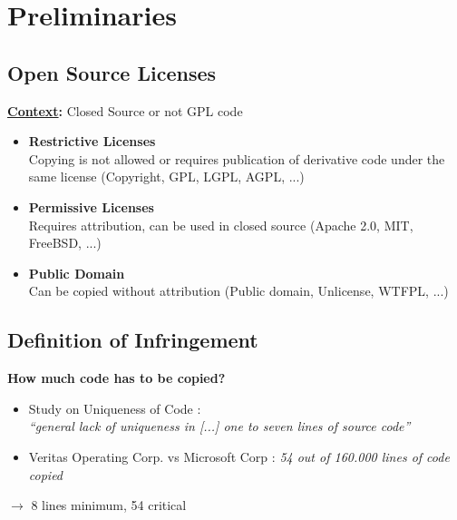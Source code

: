 
\section{Preliminaries}
\subsection{Open Source Licenses}
\begin{frame}{\insertsubsection}
	\textbf{\underline{Context}:} Closed Source or not GPL code
	
	\begin{itemize}
		\item \textbf{Restrictive Licenses}\\
			{\footnotesize Copying is not allowed or requires publication of derivative code under the same license (Copyright, GPL, LGPL, AGPL, ...)}
		\item \textbf{Permissive Licenses}\\
			{\footnotesize Requires attribution, can be used in closed source (Apache 2.0, MIT, FreeBSD, ...)}
		\item \textbf{Public Domain}\\
			{\footnotesize Can be copied without attribution (Public domain, Unlicense, WTFPL, ...)}
	\end{itemize}
\end{frame}



\subsection{Definition of Infringement}
\begin{frame}{\insertsubsection}
		\textbf{How much code has to be copied?}
		\begin{itemize}
			\item Study on Uniqueness of Code \cite{2010-gabel-su-source-code-uniqueness}:\\
				\textit{\enquote{general lack of uniqueness in [...] one to seven lines of source code}}
			\item Veritas Operating Corp. vs Microsoft Corp \cite{mertzel2008copying}:
				\textit{54 out of 160.000 lines of code copied}
		\end{itemize}
		\begin{center}
			$\rightarrow$ 8 lines minimum, 54 critical
		\end{center}
\end{frame}

